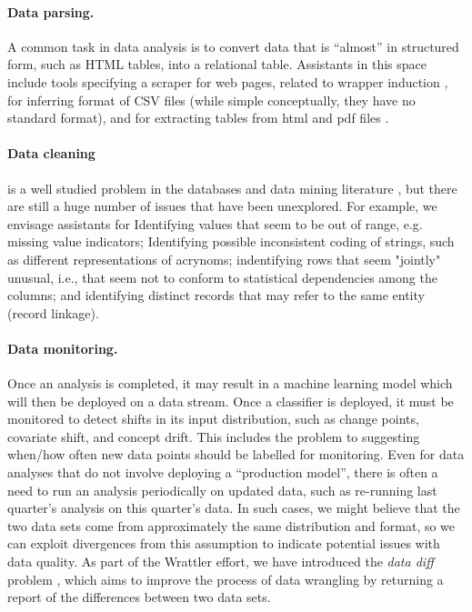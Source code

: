 \documentclass[sigplan,preprint,10pt]{acmart}\settopmatter{printfolios=true,printccs=false,printacmref=false}
\theoremstyle{plain}
\theoremstyle{definition}
\begin{document}
{\paragraph{Data parsing.}
A common task in data analysis is to convert
data that is ``almost'' in structured form,
such as HTML tables, into a relational table.
Assistants in this space include
tools specifying a scraper for web pages, related
to wrapper induction \cite{Kushmerick1997WrapperIF},
for inferring format of CSV files (while simple
conceptually, they have no standard format), and
for extracting tables from html and pdf files
\cite{pinto03table}.

\paragraph{Data cleaning} is a well studied
problem in the databases and data mining literature
\cite{abedjan2016detecting,ilyas2015},
but there are still a huge number of issues that have been unexplored.
For example, we envisage assistants for
Identifying values that seem to be out of range, e.g. missing value indicators;
Identifying possible inconsistent coding of strings,
such as different representations of acrynoms;
indentifying rows that seem "jointly" unusual, i.e., that seem not to conform to statistical dependencies among the columns; and
identifying distinct records that may refer to the same entity (record linkage).

\paragraph{Data monitoring.} Once an analysis
is completed, it may result in a machine learning
model which will then be deployed on a data stream.
Once a classifier is deployed, it must be monitored 
to detect shifts in its input distribution,
such as change points, covariate shift, and
concept drift. This includes the problem 
to suggesting when/how often new data points should be labelled for monitoring.
Even for data analyses that do not involve
deploying a ``production model'', there is
often a need to run an analysis periodically on updated data, such as re-running last quarter's
analysis on this quarter's data.
In such cases, we might believe that the two data
sets come from approximately the same distribution
and format, so we can exploit
divergences from this assumption to indicate
potential issues with data quality.
As part of the Wrattler effort, we have
introduced the \emph{data diff} problem \cite{datadiff},
which aims to improve the process of data wrangling by 
returning a report of the differences between two data sets.

}
\end{document}

